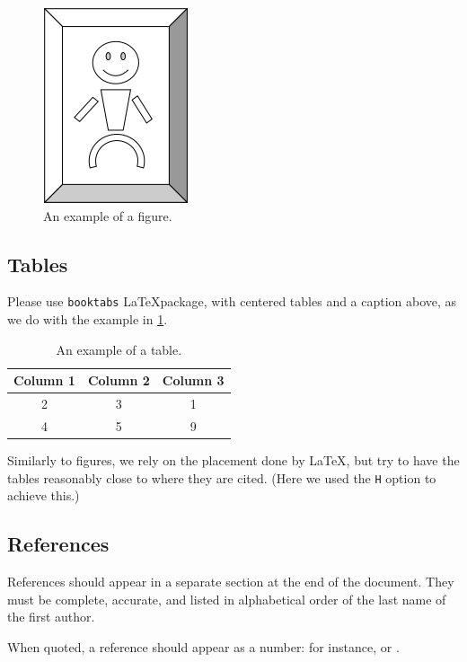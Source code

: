 \documentclass{qor-eume-ext-abstract}
\begin{document}
\begin{figure}[H]
  \centering
  \includegraphics{figures/figure.png}
  \caption{An example of a figure.\label{fig:example}}
\end{figure}

\subsection{Tables}
Please use \texttt{booktabs} \LaTeX package, with centered tables and a caption
above, as we do with the example in \cref{tab:example}.

\begin{table}[H]
  \centering
  \caption{An example of a table.\label{tab:example}}
  \begin{tabular}{ccc}
    \toprule
    Column 1 & Column 2 & Column 3\\
    \midrule
    2 & 3 & 1\\
    4 & 5 & 9\\
    \bottomrule
  \end{tabular}
\end{table}

Similarly to figures, we rely on the placement done by \LaTeX, but try to have
the tables reasonably close to where they are cited. (Here we used the
\texttt{H} option to achieve this.)

\subsection{References}
References should appear in a separate section at the end of the document. They
must be complete, accurate, and listed in alphabetical order of the last name of
the first author.\vspace{\baselineskip}

When quoted, a reference should appear as a number: for instance,
\cite{sorensen2006} or \cite{bochkarev2024}.

\printbibliography
\end{document}
